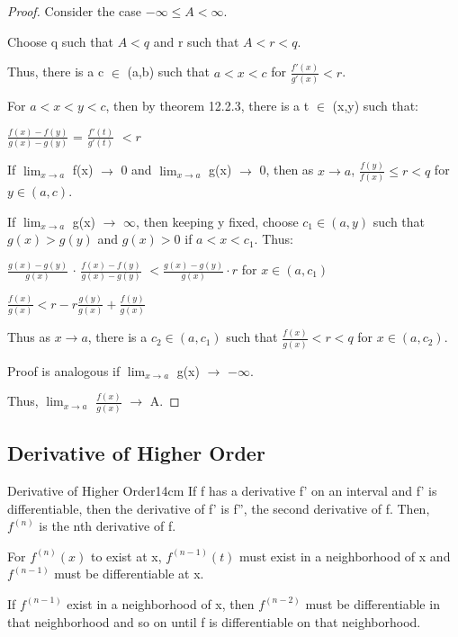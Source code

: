     \begin{proof}
        Consider the case $-\infty \leq A < \infty$.

        Choose q such that $A < q$ and r such that $A < r < q$.

        Thus, there is a c $\in$ (a,b) such that $a < x < c$
        for $\frac{f'(x)}{g'(x)} < r$.

        For $a < x < y < c$, then by {\color{red} theorem 12.2.3},
        there is a t $\in$ (x,y) such that:

        \hspace{1cm}
        $\frac{f(x) - f(y)}{g(x)-g(y)}$
        = $\frac{f'(t)}{g'(t)}$ $< r$

        If $\lim_{x \rightarrow a}$ f(x) $\rightarrow$ 0 and
        $\lim_{x \rightarrow a}$ g(x) $\rightarrow$ 0, then
        as $x \rightarrow a$,
        $\frac{f(y)}{f(x)} \leq r < q$ for $y \in (a,c)$.

        If $\lim_{x \rightarrow a}$ g(x) $\rightarrow$ $\infty$, then
        keeping y fixed, choose $c_1 \in (a,y)$ such that $g(x) > g(y)$
        and $g(x) > 0$ if $a < x < c_1$. Thus:

        \hspace{1cm}
        $\frac{g(x)-g(y)}{g(x)}$ $\cdot$ $\frac{f(x) - f(y)}{g(x)-g(y)}$
        $< \frac{g(x)-g(y)}{g(x)} \cdot r$ for $x \in (a,c_1)$

        \hspace{1cm}
        $\frac{f(x)}{g(x)} < r - r \frac{g(y)}{g(x)} + \frac{f(y)}{g(x)}$
        
        Thus as $x \rightarrow a$, there is a $c_2 \in (a,c_1)$ such that
        $\frac{f(x)}{g(x)} < r < q$ for $x \in (a,c_2)$.

        Proof is analogous if $\lim_{x \rightarrow a}$ g(x) $\rightarrow$ $-\infty$.

        Thus, $\lim_{x \rightarrow a}$ $\frac{f(x)}{g(x)}$ $\rightarrow$ A.
    \end{proof}

    \vspace{0.5cm}





\subsection{ Derivative of Higher Order }

    \begin{definition}{Derivative of Higher Order}{14cm}
        If f has a derivative f' on an interval and f' is differentiable,
        then the derivative of f' is f'', the second derivative of f.
        Then, $f^{(n)}$ is the nth derivative of f.

        For $f^{(n)}(x)$ to exist at x, $f^{(n-1)}(t)$ must exist
        in a neighborhood of x and $f^{(n-1)}$ must be differentiable at x.
        
        If $f^{(n-1)}$ exist in a neighborhood of x, then $f^{(n-2)}$
        must be differentiable in that neighborhood and
        so on until f is differentiable on that neighborhood.
    \end{definition}

